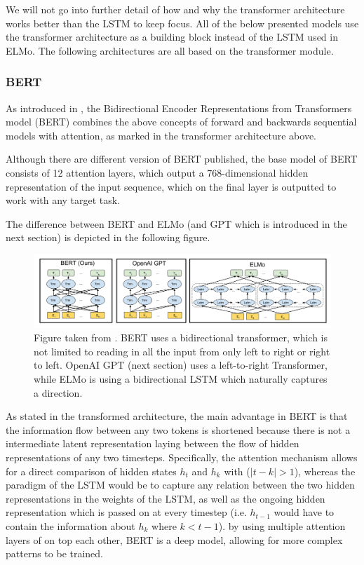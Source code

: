 \documentclass[a4paper,12pt,twoside,openright]{report}
\begin{document}
We will not go into further detail of how and why the transformer architecture works better than the LSTM to keep focus.
All of the below presented models use the transformer architecture as a building block instead of the LSTM used in ELMo.
The following architectures are all based on the transformer module.

\subsubsection{BERT}
 
As introduced in \cite{devlin18}, the Bidirectional Encoder Representations from Transformers model (BERT) combines the above concepts of forward and backwards sequential models with attention, as marked in the transformer architecture above.

Although there are different version of BERT published, the base model of BERT consists of 12 attention layers, which output a 768-dimensional hidden representation of the input sequence, which on the final layer is outputted to work with any target task.

The difference between BERT and ELMo (and GPT which is introduced in the next section) is depicted in the following figure.

\begin{figure}[H]
	\center
  \includegraphics[width=\linewidth]{./assets/background/BERT_GPT_ELMo.png}
  \caption{Figure taken from \cite{devlin18}. BERT uses a bidirectional transformer, which is not limited to reading in all the input from only left to right or right to left. OpenAI GPT (next section) uses a left-to-right Transformer, while ELMo is using a bidirectional LSTM which naturally captures a direction. }
  \label{fig:attention_is_all_you_need}
\end{figure}


As stated in the transformed architecture, the main advantage in BERT is that the information flow between any two tokens is shortened because there is not a intermediate latent representation laying between the flow of hidden representations of any two timesteps.
Specifically, the attention mechanism allows for a direct comparison of hidden states $h_t$ and $h_k$ with ($|t - k| > 1$), whereas the paradigm of the LSTM would be to capture any relation between the two hidden representations in the weights of the LSTM, as well as the ongoing hidden representation which is passed on at every timestep (i.e. $h_{t-1}$ would have to contain the information about $h_k$ where $k < t - 1$).
by using multiple attention layers of on top each other, BERT is a deep model, allowing for more complex patterns to be trained. \\
\end{document}
